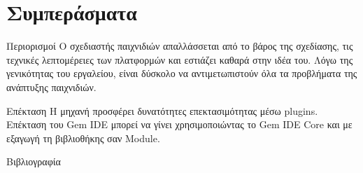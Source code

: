 \documentclass{beamer}
\begin{document}
	\section{Συμπεράσματα}
	\begin{frame}{Περιορισμοί}
		O σχεδιαστής παιχνιδιών απαλλάσσεται από το βάρος της σχεδίασης, τις τεχνικές λεπτομέρειες των πλατφορμών και εστιάζει καθαρά στην ιδέα του.
		\newline
		\newline
		Λόγω της γενικότητας του εργαλείου, είναι δύσκολο να αντιμετωπιστούν όλα τα προβλήματα της ανάπτυξης παιχνιδιών.
	\end{frame}		
	\begin{frame}{Επέκταση}
		Η μηχανή προσφέρει δυνατότητες επεκτασιμότητας μέσω plugins. 
		\newline
		\newline
		Επέκταση του \alert{Gem IDE} μπορεί να γίνει χρησιμοποιώντας το \alert{Gem IDE Core} και με εξαγωγή τη βιβλιοθήκης σαν \alert{Module}.
	\end{frame}		
	
	
	\begin{frame}[allowframebreaks]{Βιβλιογραφία}
		\printbibliography[heading=none]
	\end{frame}
	
\end{document}
